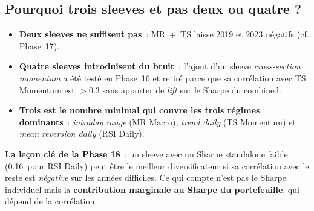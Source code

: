 \subsection{Pourquoi trois sleeves et pas deux ou quatre ?}

\begin{itemize}
\item \textbf{Deux sleeves ne suffisent pas}~: MR~+~TS laisse 2019 et 2023 négatifs (cf. Phase~17).
\item \textbf{Quatre sleeves introduisent du bruit}~: l'ajout d'un sleeve \emph{cross-section momentum} a été testé en Phase~16 et retiré parce que sa corrélation avec TS Momentum est $>0.3$ sans apporter de \emph{lift} sur le Sharpe du combined.
\item \textbf{Trois est le nombre minimal qui couvre les trois régimes dominants}~: \emph{intraday range} (MR Macro), \emph{trend daily} (TS Momentum) et \emph{mean reversion daily} (RSI Daily).
\end{itemize}

\begin{insightbox}
\textbf{La leçon clé de la Phase 18}~: un sleeve avec un Sharpe standalone faible (0.16~pour RSI Daily) peut être le meilleur diversificateur si sa corrélation avec le reste est \emph{négative} sur les années difficiles. Ce qui compte n'est pas le Sharpe individuel mais la \textbf{contribution marginale au Sharpe du portefeuille}, qui dépend de la corrélation.
\end{insightbox}
